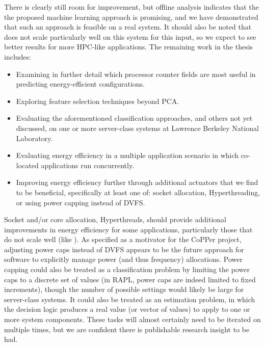 There is clearly still room for improvement, but offline analysis indicates that the the proposed machine learning approach is promising, and we have demonstrated that such an approach is feasible on a real system.
It should also be noted that  does not scale particularly well on this system for this input, so we expect to see better results for more HPC-like applications.
The remaining work in the thesis includes:
\begin{itemize}
\item Examining in further detail which processor counter fields are most useful in predicting energy-efficient configurations.
\item Exploring feature selection techniques beyond PCA.
\item Evaluating the aforementioned classification approaches, and others not yet discussed, on one or more server-class systems at Lawrence Berkeley National Laboratory.
\item Evaluating energy efficiency in a multiple application scenario in which co-located applications run concurrently.
\item Improving energy efficiency further through additional actuators that we find to be beneficial, specifically at least one of: socket allocation, Hyperthreading, or using power capping instead of DVFS.
\end{itemize}
Socket and/or core allocation, \eg Hyperthreads, should provide additional improvements in energy efficiency for some applications, particularly those that do not scale well (like ).
As specified as a motivator for the CoPPer project, adjusting power caps instead of DVFS appears to be the future approach for software to explicitly manage power (and thus frequency) allocations.
Power capping could also be treated as a classification problem by limiting the power caps to a discrete set of values (\eg in RAPL, power caps are indeed limited to fixed increments), though the number of possible settings would likely be large for server-class systems.
It could also be treated as an estimation problem, in which the decision logic produces a real value (or vector of values) to apply to one or more system components.
These tasks will almost certainly need to be iterated on multiple times, but we are confident there is publishable research insight to be had.



